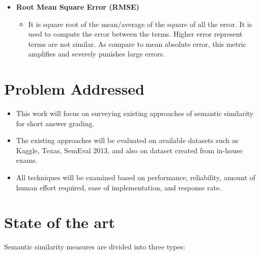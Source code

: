 \documentclass{article}
\begin{document}
\begin{itemize}
\begin{itemize}
\begin{itemize}
\begin{itemize}
		\end{itemize}
	\item \textbf{Root Mean Square Error (RMSE)}
		\begin{itemize}
		\item It is square root of the mean/average of the square of all the error. It is used to compute the error between the terms. Higher error represent terms are not similar. As compare to mean absolute error, this metric amplifies and severely punishes large errors.\cite{kaggleroot}
		\end{itemize}
	\end{itemize}
	\end{itemize}
\end{itemize}

\newpage
\section{Problem Addressed}
\begin{itemize}
\item This work will focus on surveying existing approaches of semantic similarity for short answer grading.
\item The existing approaches will be evaluated on available datasets such as Kaggle, Texas, SemEval 2013, and also on dataset created from in-house exams. %
\item All techniques will be examined based on performance, reliability, amount of human effort required, ease of implementation, and response rate.
\end{itemize}

 	 
\newpage
\section{State of the art}

Semantic similarity measures are divided into three types:
\end{document}
